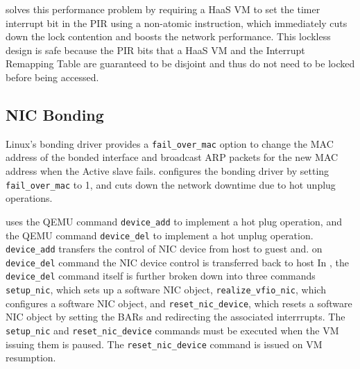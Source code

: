 \na solves this performance problem by requiring a HaaS VM to set the timer interrupt bit
in the PIR using a non-atomic instruction, which immediately cuts down the lock contention
and boosts the network performance. This lockless design is safe because the PIR bits that a HaaS VM and the Interrupt Remapping Table are guaranteed to be disjoint and thus do not need to be locked before being accessed.


\subsection{NIC Bonding}
Linux's bonding driver provides a \texttt{fail\_over\_mac} option to change 
the MAC address of the bonded interface and broadcast ARP packets for the new MAC address when the Active slave fails. \na configures the bonding driver by setting   
\texttt{fail\_over\_mac} to 1, and cuts down the
network downtime due to hot unplug operations.


\na uses the QEMU command \texttt{device\_add} to implement a hot plug operation,
and the QEMU command \texttt{device\_del} to implement a hot unplug operation. 
\texttt{device\_add} transfers the control of NIC device from host to guest and.
on \texttt{device\_del} command the NIC device control is transferred back to host 
In \na, the \texttt{device\_del} command itself is further broken down 
into three commands \texttt{setup\_nic}, which sets up a software NIC object, 
\texttt{realize\_vfio\_nic}, which configures a software NIC object, and \texttt{reset\_nic\_device}, which resets a software NIC object by setting the 
BARs and redirecting the associated interrrupts. 
The \texttt{setup\_nic} and \texttt{reset\_nic\_device} commands must be executed when the VM issuing them is paused. The \texttt{reset\_nic\_device} command is issued on VM resumption. 
